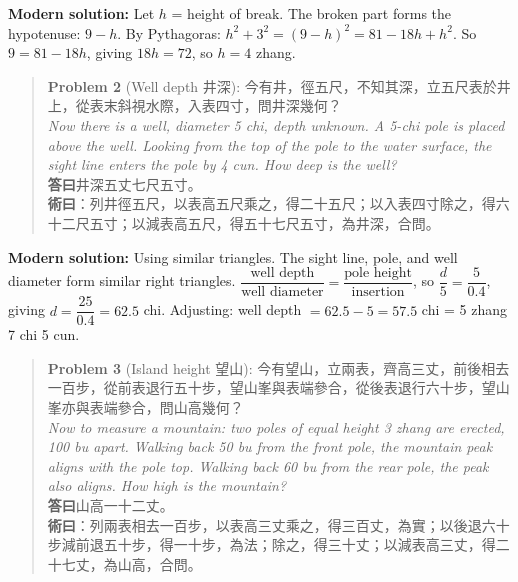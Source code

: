 \documentclass[11pt,a4paper]{article}
\newenvironment{vol3problembox}{%
  \begin{quote}
  \itshape
  \color{vol3color}
}{%
  \end{quote}
}
\begin{document}
\textbf{Modern solution:} Let $h$ = height of break. The broken part forms the hypotenuse: $9 - h$. By Pythagoras: $h^2 + 3^2 = (9-h)^2 = 81 - 18h + h^2$. So $9 = 81 - 18h$, giving $18h = 72$, so $h = 4$ zhang.

\vspace{0.3cm}

\begin{vol3problembox}
\textbf{Problem 2} (Well depth 井深): 今有井，徑五尺，不知其深，立五尺表於井上，從表末斜視水際，入表四寸，問井深幾何？\\[0.2cm]
\textit{Now there is a well, diameter 5 chi, depth unknown. A 5-chi pole is placed above the well. Looking from the top of the pole to the water surface, the sight line enters the pole by 4 cun. How deep is the well?}\\[0.2cm]
\textbf{答曰}井深五丈七尺五寸。\\[0.2cm]
\textbf{術曰}：列井徑五尺，以表高五尺乘之，得二十五尺；以入表四寸除之，得六十二尺五寸；以減表高五尺，得五十七尺五寸，為井深，合問。
\end{vol3problembox}

\textbf{Modern solution:} Using similar triangles. The sight line, pole, and well diameter form similar right triangles. $\dfrac{\text{well depth}}{\text{well diameter}} = \dfrac{\text{pole height}}{\text{insertion}}$, so $\dfrac{d}{5} = \dfrac{5}{0.4}$, giving $d = \dfrac{25}{0.4} = 62.5$ chi. Adjusting: well depth $= 62.5 - 5 = 57.5$ chi = 5 zhang 7 chi 5 cun.

\vspace{0.3cm}

\begin{vol3problembox}
\textbf{Problem 3} (Island height 望山): 今有望山，立兩表，齊高三丈，前後相去一百步，從前表退行五十步，望山峯與表端參合，從後表退行六十步，望山峯亦與表端參合，問山高幾何？\\[0.2cm]
\textit{Now to measure a mountain: two poles of equal height 3 zhang are erected, 100 bu apart. Walking back 50 bu from the front pole, the mountain peak aligns with the pole top. Walking back 60 bu from the rear pole, the peak also aligns. How high is the mountain?}\\[0.2cm]
\textbf{答曰}山高一十二丈。\\[0.2cm]
\textbf{術曰}：列兩表相去一百步，以表高三丈乘之，得三百丈，為實；以後退六十步減前退五十步，得一十步，為法；除之，得三十丈；以減表高三丈，得二十七丈，為山高，合問。
\end{vol3problembox}
\end{document}
